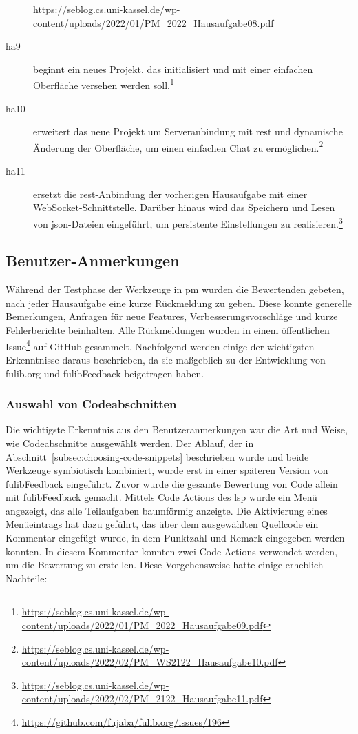 \begin{description}
{        \url{https://seblog.cs.uni-kassel.de/wp-content/uploads/2022/01/PM_2022_Hausaufgabe08.pdf}
    }
    \item[\ac{ha}9] beginnt ein neues Projekt, das initialisiert und mit einer einfachen Oberfläche versehen werden soll.\footnote{
        \url{https://seblog.cs.uni-kassel.de/wp-content/uploads/2022/01/PM_2022_Hausaufgabe09.pdf}
    }
    \item[\ac{ha}10] erweitert das neue Projekt um Serveranbindung mit \ac{rest} und dynamische Änderung der Oberfläche, um einen einfachen Chat zu ermöglichen.\footnote{
        \url{https://seblog.cs.uni-kassel.de/wp-content/uploads/2022/02/PM_WS2122_Hausaufgabe10.pdf}
    }
    \item[\ac{ha}11] ersetzt die \ac{rest}-Anbindung der vorherigen Hausaufgabe mit einer WebSocket-Schnittstelle.
    Darüber hinaus wird das Speichern und Lesen von \ac{json}-Dateien eingeführt, um persistente Einstellungen zu realisieren.\footnote{
        \url{https://seblog.cs.uni-kassel.de/wp-content/uploads/2022/02/PM_2122_Hausaufgabe11.pdf}
    }
\end{description}

\subsection{Benutzer-Anmerkungen}\label{subsec:user-feedback}

Während der Testphase der Werkzeuge in \ac{pm} wurden die Bewertenden gebeten, nach jeder Hausaufgabe eine kurze Rückmeldung zu geben.
Diese konnte generelle Bemerkungen, Anfragen für neue Features, Verbesserungsvorschläge und kurze Fehlerberichte beinhalten.
Alle Rückmeldungen wurden in einem öffentlichen Issue\footnote{
    \url{https://github.com/fujaba/fulib.org/issues/196}
} auf GitHub gesammelt.
Nachfolgend werden einige der wichtigsten Erkenntnisse daraus beschrieben, da sie maßgeblich zu der Entwicklung von fulib.org und fulibFeedback beigetragen haben.

\subsubsection{Auswahl von Codeabschnitten}

Die wichtigste Erkenntnis aus den Benutzeranmerkungen war die Art und Weise, wie Codeabschnitte ausgewählt werden.
Der Ablauf, der in Abschnitt~\ref{subsec:choosing-code-snippets} beschrieben wurde und beide Werkzeuge symbiotisch kombiniert, wurde erst in einer späteren Version von fulibFeedback eingeführt.
Zuvor wurde die gesamte Bewertung von Code allein mit fulibFeedback gemacht.
Mittels Code Actions des \ac{lsp} wurde ein Menü angezeigt, das alle Teilaufgaben baumförmig anzeigte.
Die Aktivierung eines Menüeintrags hat dazu geführt, das über dem ausgewählten Quellcode ein Kommentar eingefügt wurde, in dem Punktzahl und Remark eingegeben werden konnten.
In diesem Kommentar konnten zwei Code Actions verwendet werden, um die Bewertung zu erstellen.
Diese Vorgehensweise hatte einige erheblich Nachteile:

